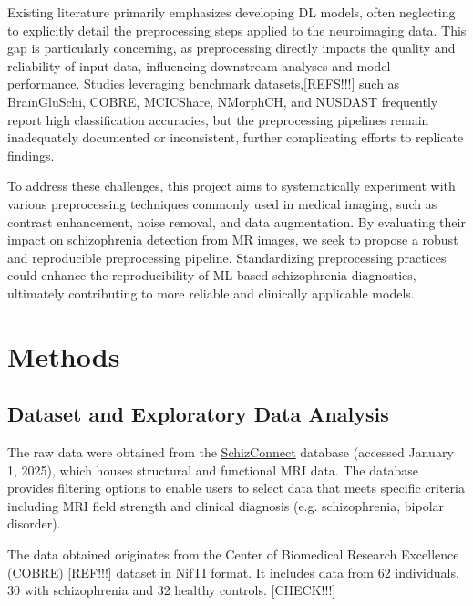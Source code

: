 Existing literature primarily emphasizes developing DL models, often neglecting to explicitly detail the preprocessing steps applied to the neuroimaging data. This gap is particularly concerning, as preprocessing directly impacts the quality and reliability of input data, influencing downstream analyses and model performance. Studies leveraging benchmark datasets,[REFS!!!] such as BrainGluSchi, COBRE, MCICShare, NMorphCH, and NUSDAST frequently report high classification accuracies, but the preprocessing pipelines remain inadequately documented or inconsistent, further complicating efforts to replicate findings.


To address these challenges, this project aims to systematically experiment with various preprocessing techniques commonly used in medical imaging, such as contrast enhancement, noise removal, and data augmentation. By evaluating their impact on schizophrenia detection from MR images, we seek to propose a robust and reproducible preprocessing pipeline. Standardizing preprocessing practices could enhance the reproducibility of ML-based schizophrenia diagnostics, ultimately contributing to more reliable and clinically applicable models.

\section{Methods}

\subsection{Dataset and Exploratory Data Analysis}

The raw data were obtained from the \href{http://schizconnect.org}{SchizConnect} database (accessed January 1, 2025), which houses structural and functional MRI data. The database provides filtering options to enable users to select data that meets specific criteria including MRI field strength and clinical diagnosis (e.g. schizophrenia, bipolar disorder).

The data obtained originates from the Center of Biomedical Research Excellence (COBRE) [REF!!!] dataset in NifTI format. It includes data from 62 individuals, 30 with schizophrenia and 32 healthy controls. [CHECK!!!]

